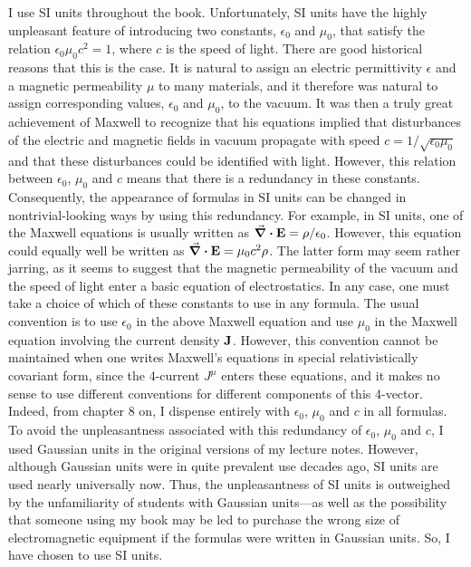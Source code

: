 I use SI units throughout the book. Unfortunately, SI units have the highly unpleasant feature of introducing two constants, $\epsilon_0$ and $\mu_0$, that satisfy the relation $\epsilon_0 \mu_0 c^2 = 1$, where $c$ is the speed of light. There are good historical reasons that this is the case. It is natural to assign an electric permittivity $\epsilon$ and a magnetic permeability $\mu$ to many materials, and it therefore was natural to assign corresponding values, $\epsilon_0$ and $\mu_0$, to the vacuum. It was then a truly great achievement of Maxwell to recognize that his equations implied that disturbances of the electric and magnetic fields in vacuum propagate with speed $c = 1/\sqrt{\epsilon_0 \mu_0}$ and that these disturbances could be identified with light. However, this relation between $\epsilon_0$, $\mu_0$ and $c$ means that there is a redundancy in these constants. Consequently, the appearance of formulas in SI units can be changed in nontrivial-looking ways by using this redundancy. For example, in SI units, one of the Maxwell equations is usually written as $\div \vb{E} = \rho/\epsilon_{0}$. However, this equation could equally well be written as $\div \vb{E} = \mu_0 c^2 \rho$. The latter form may seem rather jarring, as it seems to suggest that the magnetic permeability of the vacuum and the speed of light enter a basic equation of electrostatics. In any case, one must take a choice of which of these constants to use in any formula. The usual convention is to use $\epsilon_0$ in the above Maxwell equation and use $\mu_0$ in the Maxwell equation involving the current density $\vb{J}$. However, this convention cannot be maintained when one writes Maxwell's equations in special relativistically covariant form, since the 4-current $J^\mu$ enters these equations, and it makes no sense to use different conventions for different components of this 4-vector. Indeed, from chapter 8 on, I dispense entirely with $\epsilon_0$, $\mu_0$ and $c$ in all formulas. To avoid the unpleasantness associated with this redundancy of      
$\epsilon_0$, $\mu_0$ and $c$, I used Gaussian units in the original versions of my lecture notes. However, although Gaussian units were in quite prevalent use decades ago, SI units are used nearly universally now. Thus, the unpleasantness of SI units is outweighed by the unfamiliarity of students with Gaussian units---as well as the possibility that someone using my book may be led to purchase the wrong size of electromagnetic equipment if the formulas were written in Gaussian units. So, I have chosen to use SI units. 

